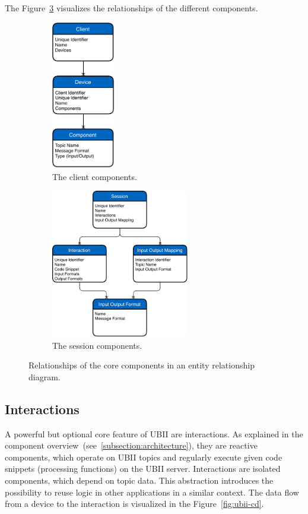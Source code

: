 The Figure~\ref{fig:ubii-er} visualizes the relationships of the different components.

\begin{figure}[htpb]
  \centering
  \begin{subfigure}{.5\textwidth}
    \centering
    \includegraphics[height=6.5cm]{figures/implementation/ubii_er_client.pdf}
    \caption{The client components.}\label{fig:ubii-er-client}
  \end{subfigure}%
  \begin{subfigure}{.5\textwidth}
    \centering
    \includegraphics[height=6.5cm]{figures/implementation/ubii_er_server.pdf}
    \caption{The session components.}\label{fig:ubii-er-server}
  \end{subfigure}
  \caption[UBII components diagram]{Relationships of the core components in an entity relationship diagram.}\label{fig:ubii-er}
\end{figure}


\subsection{Interactions}\label{subsection:interactions}
A powerful but optional core feature of \ac{UBII} are interactions. As explained in the component overview~(see~\ref{subsection:architecture}), they are reactive components, which operate on \ac{UBII} topics and regularly execute given code snippets (processing functions) on the \ac{UBII} server. Interactions are isolated components, which depend on topic data. This abstraction introduces the possibility to reuse logic in other applications in a similar context. The data flow from a device to the interaction is visualized in the Figure~\ref{fig:ubii-cd}.

